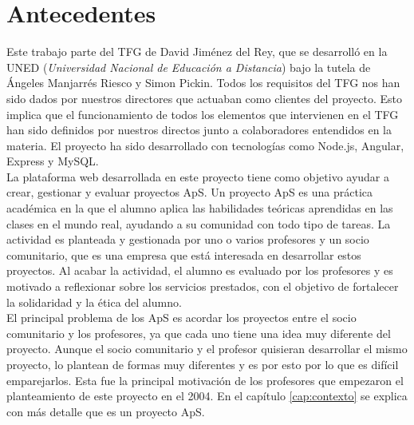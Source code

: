 \documentclass[11pt]{book}
\begin{document}
	\section{Antecedentes}
	Este trabajo parte del TFG de David Jiménez del Rey, que se desarrolló en la UNED (\emph{Universidad Nacional de Educación a Distancia}) bajo la tutela de Ángeles Manjarrés Riesco y Simon Pickin. Todos los requisitos del TFG nos han sido dados por nuestros directores que actuaban como clientes del proyecto. Esto implica que el funcionamiento de todos los elementos que intervienen en el TFG han sido definidos por nuestros directos junto a colaboradores entendidos en la materia. El proyecto ha sido desarrollado con tecnologías como Node.js, Angular, Express y MySQL.\\
	La plataforma web desarrollada en este proyecto tiene como objetivo ayudar a crear, gestionar y evaluar proyectos ApS. Un proyecto ApS es una práctica académica en la que el alumno aplica las habilidades teóricas aprendidas en las clases en el mundo real, ayudando a su comunidad con todo tipo de tareas. La actividad es planteada y gestionada por uno o varios profesores y un socio comunitario, que es una empresa que está interesada en desarrollar estos proyectos. Al acabar la actividad, el alumno es evaluado por los profesores y es motivado a reflexionar sobre los servicios prestados, con el objetivo de fortalecer la solidaridad y la ética del alumno. \\
	El principal problema de los ApS es acordar los proyectos entre el socio comunitario y los profesores, ya que cada uno tiene una idea muy diferente del proyecto. Aunque el socio comunitario y el profesor quisieran desarrollar el mismo proyecto, lo plantean de formas muy diferentes y es por esto por lo que es difícil emparejarlos. Esta fue la principal motivación de los profesores que empezaron el planteamiento de este proyecto en el 2004. En el capítulo \ref{cap:contexto} se explica con más detalle que es un proyecto ApS.\\
\end{document}
